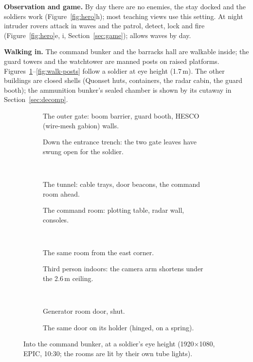 \textbf{Observation and game.} By day there are no enemies, the  stay docked and the soldiers work
(Figure~\ref{fig:hero}h); most teaching views use this setting. At night intruder rovers attack in waves and the 
patrol, detect, lock and fire (Figure~\ref{fig:hero}e, i, Section~\ref{sec:game});  allows waves by day.

\textbf{Walking in.} The command bunker and the barracks hall are walkable inside; the guard towers and the watchtower
are manned posts on raised platforms. Figures~\ref{fig:walk-bunker}--\ref{fig:walk-posts} follow a soldier at eye
height (1.7\,m). The other buildings are closed shells (Quonset huts, containers, the radar cabin, the guard booth); the
ammunition bunker's sealed chamber is shown by its cutaway in Section~\ref{sec:decomp}.

\begin{figure}[p]
\centering
\begin{subfigure}[t]{0.49\linewidth}\caption{The outer gate: boom barrier, guard booth, HESCO (wire-mesh gabion) walls.}\end{subfigure}\hfill
\begin{subfigure}[t]{0.49\linewidth}\caption{Down the entrance trench: the two gate leaves have swung open for the soldier.}\end{subfigure}\\[1.2mm]
\begin{subfigure}[t]{0.49\linewidth}\caption{The tunnel: cable trays, door beacons, the command room ahead.}\end{subfigure}\hfill
\begin{subfigure}[t]{0.49\linewidth}\caption{The command room: plotting table, radar wall, consoles.}\end{subfigure}\\[1.2mm]
\begin{subfigure}[t]{0.49\linewidth}\caption{The same room from the east corner.}\end{subfigure}\hfill
\begin{subfigure}[t]{0.49\linewidth}\caption{Third person indoors: the camera arm shortens under the 2.6\,m ceiling.}\end{subfigure}\\[1.2mm]
\begin{subfigure}[t]{0.49\linewidth}\caption{Generator room door, shut.}\end{subfigure}\hfill
\begin{subfigure}[t]{0.49\linewidth}\caption{The same door on its holder (hinged, on a spring).}\end{subfigure}
\caption{Into the command bunker, at a soldier's eye height (1920$\times$1080, EPIC, 10:30; the rooms are lit by their
own tube lights).}
\label{fig:walk-bunker}
\end{figure}

